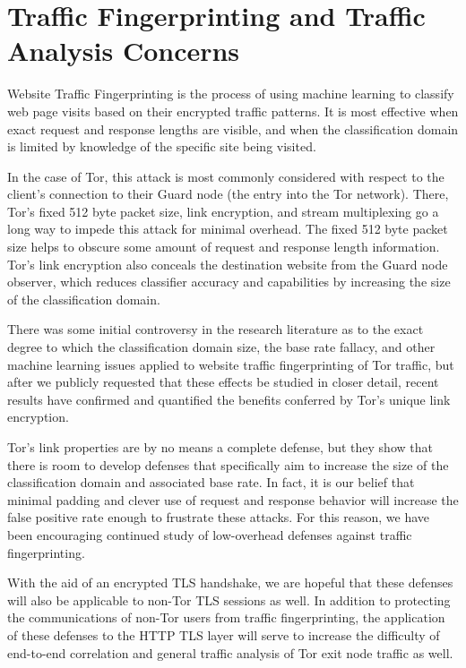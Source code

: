 \documentclass[letterpaper,11pt]{llncs}
\begin{document}
\section{Traffic Fingerprinting and Traffic Analysis Concerns}

Website Traffic Fingerprinting is the process of using machine learning to
classify web page visits based on their encrypted traffic patterns. It is most
effective when exact request and response lengths are visible, and when the
classification domain is limited by knowledge of the specific site being
visited.

In the case of Tor, this attack is most commonly considered with respect to
the client's connection to their Guard node (the entry into the Tor network).
There, Tor's fixed 512 byte packet size, link encryption, and stream
multiplexing go a long way to impede this attack for minimal overhead. The
fixed 512 byte packet size helps to obscure some amount of request and
response length information. Tor's link encryption also conceals the
destination website from the Guard node observer, which reduces classifier
accuracy and capabilities by increasing the size of the classification domain.

There was some initial controversy in the research literature as to the exact
degree to which the classification domain size, the base rate fallacy, and
other machine learning issues applied to website traffic fingerprinting of Tor
traffic, but after we publicly requested that these effects be studied in
closer detail\cite{blog-wtf}, recent results have confirmed and quantified the
benefits conferred by Tor's unique link encryption\cite{ccs-wtf}.

Tor's link properties are by no means a complete defense, but they show that
there is room to develop defenses that specifically aim to increase the size
of the classification domain and associated base rate. In fact, it is our
belief that minimal padding and clever use of request and response behavior
will increase the false positive rate enough to frustrate these attacks. For
this reason, we have been encouraging continued study of low-overhead defenses
against traffic fingerprinting\cite{torbrowser-wtf}. 

With the aid of an encrypted TLS handshake, we are hopeful that these defenses
will also be applicable to non-Tor TLS sessions as well. In addition to
protecting the communications of non-Tor users from traffic fingerprinting,
the application of these defenses to the HTTP TLS layer will serve to increase
the difficulty of end-to-end correlation and general traffic analysis of Tor
exit node traffic as well.
\end{document}
